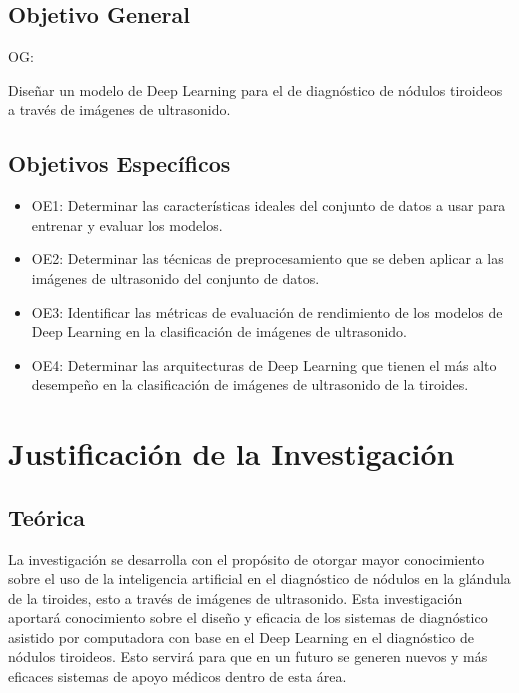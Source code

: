 \subsection{Objetivo General}
OG: \newcommand{\ObjetivoGeneral}{
Diseñar un modelo de Deep Learning para el de diagnóstico de nódulos tiroideos a través de imágenes de ultrasonido.
}
\ObjetivoGeneral
\subsection{Objetivos Específicos}
\newcommand{\Objone}{
Determinar las características ideales del conjunto de datos a usar para entrenar y evaluar los modelos.
}
\newcommand{\Objtwo}{
Determinar las técnicas de preprocesamiento que se deben aplicar a las imágenes de ultrasonido del conjunto de datos.
}
\newcommand{\Objthree}{
Identificar las métricas de evaluación de rendimiento de los modelos de Deep Learning en la clasificación de imágenes de ultrasonido.
}
\newcommand{\Objfour}{
Determinar las arquitecturas de Deep Learning que tienen el más alto desempeño en la clasificación de imágenes de ultrasonido de la tiroides.
}

\begin{itemize}
	\item OE1: {\Objone}
	\item OE2: {\Objtwo}
	\item OE3: {\Objthree}
	\item OE4: {\Objfour}
\end{itemize}



\section{Justificación de la Investigación}

\subsection{Teórica}
La investigación se desarrolla con el propósito de otorgar mayor conocimiento sobre el uso de la inteligencia artificial en el diagnóstico de nódulos en la glándula de la tiroides, esto a través de imágenes de ultrasonido. Esta investigación aportará conocimiento sobre el diseño y eficacia de los sistemas de diagnóstico asistido por computadora con base en el Deep Learning en el diagnóstico de nódulos tiroideos. Esto servirá para que en un futuro se generen nuevos y más eficaces sistemas de apoyo médicos dentro de esta área.

